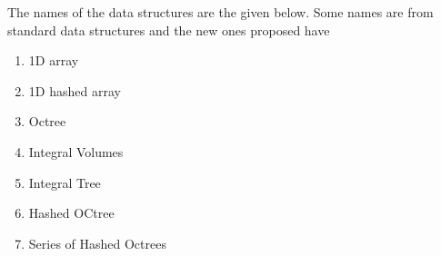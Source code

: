 \documentclass{subfiles}
\begin{document}
The names of the data structures are the given below. Some names are from standard data structures and the new ones proposed have 
\begin{enumerate}[noitemsep]
\item 1D array
\item 1D hashed array
\item Octree
\item Integral Volumes
\item Integral Tree
\item Hashed OCtree
\item Series of Hashed Octrees
\end{enumerate} 
\end{document}
